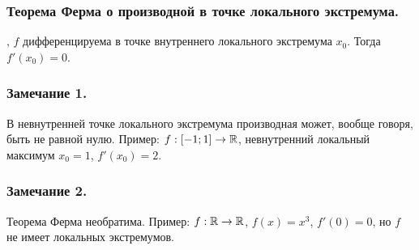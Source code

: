 \subsubsection{Теорема Ферма о производной в точке локального экстремума.}

\fXR, $f$ дифференцируема в точке внутреннего локального экстремума $x_0$.
Тогда $f'(x_0)=0$.

\subsubsection{Замечание 1.}

В невнутренней точке локального экстремума производная может, вообще говоря, быть не равной нулю.
Пример: $f:[-1;1]\to \mathbb{R}$, невнутренний локальный максимум $x_0 = 1$, $f'(x_0)=2$.

\subsubsection{Замечание 2.}
Теорема Ферма необратима.
Пример: $f:\mathbb{R}\to\mathbb{R}$, $f(x)=x^3$, $f'(0)=0$, но $f$ не имеет локальных экстремумов.



